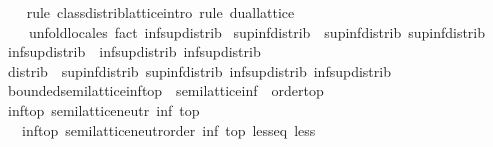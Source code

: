 \begin{isabellebody}
%
\isadelimproof
\ \ %
\endisadelimproof
%
\isatagproof
{}\isamarkupfalse%
\ {\isacharparenleft}{\kern0pt}rule\ class{\isachardot}{\kern0pt}distrib{\isacharunderscore}{\kern0pt}lattice{\isachardot}{\kern0pt}intro{\isacharcomma}{\kern0pt}\ rule\ dual{\isacharunderscore}{\kern0pt}lattice{\isacharparenright}{\kern0pt}\isanewline
\ \ \ \ {\isacharparenleft}{\kern0pt}unfold{\isacharunderscore}{\kern0pt}locales{\isacharcomma}{\kern0pt}\ fact\ inf{\isacharunderscore}{\kern0pt}sup{\isacharunderscore}{\kern0pt}distrib{}{\isacharparenright}{\kern0pt}%
\endisatagproof
{\isafoldproof}%
%
\isadelimproof
\isanewline
%
\endisadelimproof
\isanewline
{}\isamarkupfalse%
\ sup{\isacharunderscore}{\kern0pt}inf{\isacharunderscore}{\kern0pt}distrib\ {\isacharequal}{\kern0pt}\ sup{\isacharunderscore}{\kern0pt}inf{\isacharunderscore}{\kern0pt}distrib{}\ sup{\isacharunderscore}{\kern0pt}inf{\isacharunderscore}{\kern0pt}distrib{}\isanewline
\isanewline
{}\isamarkupfalse%
\ inf{\isacharunderscore}{\kern0pt}sup{\isacharunderscore}{\kern0pt}distrib\ {\isacharequal}{\kern0pt}\ inf{\isacharunderscore}{\kern0pt}sup{\isacharunderscore}{\kern0pt}distrib{}\ inf{\isacharunderscore}{\kern0pt}sup{\isacharunderscore}{\kern0pt}distrib{}\isanewline
\isanewline
{}\isamarkupfalse%
\ distrib\ {\isacharequal}{\kern0pt}\ sup{\isacharunderscore}{\kern0pt}inf{\isacharunderscore}{\kern0pt}distrib{}\ sup{\isacharunderscore}{\kern0pt}inf{\isacharunderscore}{\kern0pt}distrib{}\ inf{\isacharunderscore}{\kern0pt}sup{\isacharunderscore}{\kern0pt}distrib{}\ inf{\isacharunderscore}{\kern0pt}sup{\isacharunderscore}{\kern0pt}distrib{}\isanewline
\isanewline
{}\isamarkupfalse%
%
\isadelimdocument
%
\endisadelimdocument
%
\isatagdocument
%
\isamarkuptrue%
%
\endisatagdocument
{\isafolddocument}%
%
\isadelimdocument
%
\endisadelimdocument
{}\isamarkupfalse%
\ bounded{\isacharunderscore}{\kern0pt}semilattice{\isacharunderscore}{\kern0pt}inf{\isacharunderscore}{\kern0pt}top\ {\isacharequal}{\kern0pt}\ semilattice{\isacharunderscore}{\kern0pt}inf\ {\isacharplus}{\kern0pt}\ order{\isacharunderscore}{\kern0pt}top\isanewline
{}\isanewline
\isanewline
{}\isamarkupfalse%
\ inf{\isacharunderscore}{\kern0pt}top{\isacharcolon}{\kern0pt}\ semilattice{\isacharunderscore}{\kern0pt}neutr\ inf\ top\isanewline
\ \ {\isacharplus}{\kern0pt}\ inf{\isacharunderscore}{\kern0pt}top{\isacharcolon}{\kern0pt}\ semilattice{\isacharunderscore}{\kern0pt}neutr{\isacharunderscore}{\kern0pt}order\ inf\ top\ less{\isacharunderscore}{\kern0pt}eq\ less\isanewline

\end{isabellebody}
